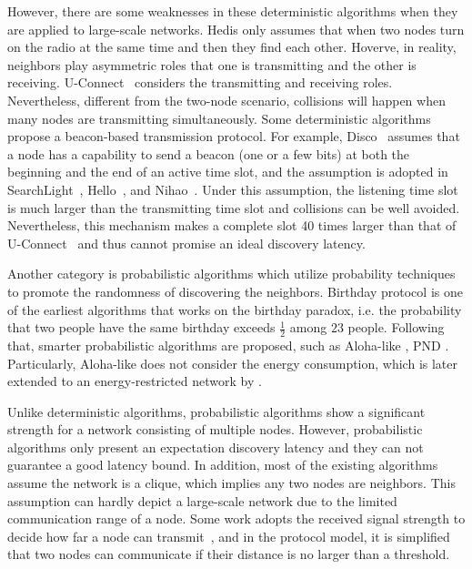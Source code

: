 However, there are some weaknesses in these deterministic algorithms when they are applied to large-scale networks.
Hedis \cite{chen2015heterogeneous} only assumes that when two nodes turn on the radio at the same time and then they find each other. 
Hoverve, in reality, neighbors play asymmetric roles that one is transmitting and the other is receiving.
U-Connect~\cite{kandhalu2010u} considers the transmitting and receiving roles.
Nevertheless, different from the two-node scenario, collisions will happen when many nodes are transmitting simultaneously. 
Some deterministic algorithms propose a beacon-based transmission protocol.
For example, Disco~\cite{dutta2008practical} assumes that a node has a capability to send a beacon (one or a few bits) at both the beginning and the end of an active time slot, and the assumption is adopted in 
SearchLight~\cite{bakht2012searchlight}, Hello~\cite{sun2014hello}, and Nihao~\cite{qiu2016talk}.
Under this assumption, the listening time slot is much larger than the transmitting time slot and collisions can be well avoided.
Nevertheless, this mechanism makes a complete slot 
40 times larger than that of U-Connect~\cite{kandhalu2010u} and thus cannot promise an ideal discovery latency.


Another category is probabilistic algorithms \cite{mcglynn2001birthday,
vasudevan2009neighbor,you2011aloha,song2014probabilistic} which utilize probability techniques to promote the randomness
of discovering the neighbors. 
Birthday protocol \cite{mcglynn2001birthday} is one of the earliest algorithms that works on the birthday
paradox, i.e. the probability that two people have the same
birthday exceeds $\frac{1}{2}$ among $23$ people. Following that,
smarter probabilistic algorithms are proposed, such as Aloha-like \cite{vasudevan2009neighbor, you2011aloha}, PND \cite{song2014probabilistic}. Particularly, Aloha-like \cite{vasudevan2009neighbor} does not consider the energy consumption, which is later extended to an energy-restricted network by \cite{you2011aloha}.

Unlike deterministic algorithms,
probabilistic algorithms show a significant strength for a network consisting of multiple nodes.
However, probabilistic algorithms only present an expectation discovery latency and they
can not guarantee a good latency bound.
In addition, most of the existing algorithms assume the network is a clique, which implies any two nodes are neighbors. 
This assumption can hardly depict a large-scale network due to the limited communication range of a node.
Some work adopts the received signal strength to decide how far a node can transmit~\cite{daiya2011experimental}, and in the protocol model, it is simplified that two nodes can communicate if their distance is no larger than a threshold.


